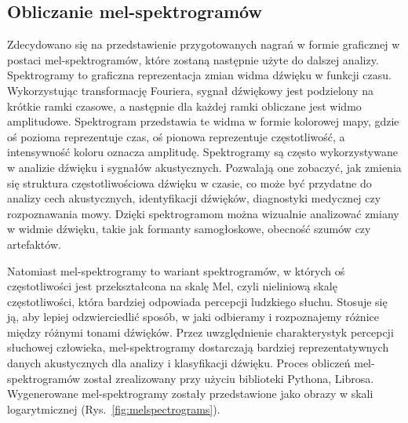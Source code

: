 \subsection{Obliczanie mel-spektrogramów}
\label{subsec:melspectrogram}

Zdecydowano się na przedstawienie przygotowanych nagrań w formie graficznej w postaci mel-spektrogramów, które zostaną następnie użyte do dalszej analizy.
Spektrogramy to graficzna reprezentacja zmian widma dźwięku w funkcji czasu.
Wykorzystując transformację Fouriera, sygnał dźwiękowy jest podzielony na krótkie ramki czasowe, a następnie dla każdej ramki obliczane jest widmo amplitudowe.
Spektrogram przedstawia te widma w formie kolorowej mapy, gdzie oś pozioma reprezentuje czas, oś pionowa reprezentuje częstotliwość, a intensywność koloru oznacza amplitudę.
Spektrogramy są często wykorzystywane w analizie dźwięku i sygnałów akustycznych.
Pozwalają one zobaczyć, jak zmienia się struktura częstotliwościowa dźwięku w czasie, co może być przydatne do analizy cech akustycznych, identyfikacji dźwięków, diagnostyki medycznej czy rozpoznawania mowy.
Dzięki spektrogramom można wizualnie analizować zmiany w widmie dźwięku, takie jak formanty samogłoskowe, obecność szumów czy artefaktów.

Natomiast mel-spektrogramy to wariant spektrogramów, w których oś częstotliwości jest przekształcona na skalę Mel, czyli nieliniową skalę częstotliwości, która bardziej odpowiada percepcji ludzkiego słuchu.
Stosuje się ją, aby lepiej odzwierciedlić sposób, w jaki odbieramy i rozpoznajemy różnice między różnymi tonami dźwięków.
Przez uwzględnienie charakterystyk percepcji słuchowej człowieka, mel-spektrogramy dostarczają bardziej reprezentatywnych danych akustycznych dla analizy i klasyfikacji dźwięku.
Proces obliczeń mel-spektrogramów został zrealizowany przy użyciu biblioteki Pythona, Librosa.
Wygenerowane mel-spektrogramy zostały przedstawione jako obrazy w skali logarytmicznej (Rys.~\ref{fig:melspectrograms}).

